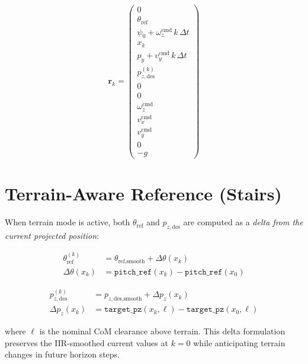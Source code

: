 \documentclass[12pt,a4paper]{report}
\newcommand{\vect}[1]{\bm{#1}}
\begin{document}
\begin{equation}
    \vect{r}_k =
    \begin{pmatrix}
        0                          \\ %
        \theta_\text{ref}          \\ %
        \psi_0 + \omega_z^\text{cmd}\,k\,\Delta t \\ %
        x_k                        \\ %
        p_y + v_y^\text{cmd}\,k\,\Delta t \\ %
        p_{z,\text{des}}^{(k)}     \\ %
        0                          \\ %
        0                          \\ %
        \omega_z^\text{cmd}        \\ %
        v_x^\text{cmd}             \\ %
        v_y^\text{cmd}             \\ %
        0                          \\ %
        -g                         %
    \end{pmatrix}
    \label{eq:Xref}
\end{equation}

\section{Terrain-Aware Reference (Stairs)}

When terrain mode is active, both $\theta_\text{ref}$ and $p_{z,\text{des}}$
are computed as a \emph{delta from the current projected position}:

\begin{align}
    \theta_\text{ref}^{(k)} &= \theta_\text{ref,smooth} + \Delta\theta(x_k) \\
    \Delta\theta(x_k)       &= \texttt{pitch\_ref}(x_k) - \texttt{pitch\_ref}(x_0)
\end{align}

\begin{align}
    p_{z,\text{des}}^{(k)} &= p_{z,\text{des,smooth}} + \Delta p_z(x_k) \\
    \Delta p_z(x_k) &= \texttt{target\_pz}(x_k, \ell) - \texttt{target\_pz}(x_0, \ell)
\end{align}

where $\ell$ is the nominal CoM clearance above terrain.  This delta
formulation preserves the IIR-smoothed current values at $k=0$ while
anticipating terrain changes in future horizon steps.
\end{document}
